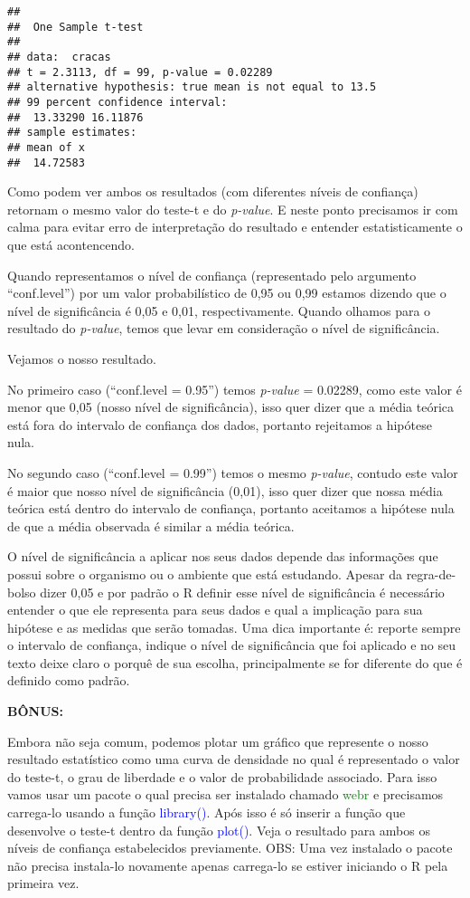 \documentclass[14pt,titlepage, oneside, openany, a4paper]{book}
\begin{document}
\begin{verbatim}
## 
##  One Sample t-test
## 
## data:  cracas
## t = 2.3113, df = 99, p-value = 0.02289
## alternative hypothesis: true mean is not equal to 13.5
## 99 percent confidence interval:
##  13.33290 16.11876
## sample estimates:
## mean of x 
##  14.72583
\end{verbatim}

Como podem ver ambos os resultados (com diferentes níveis de confiança) retornam o mesmo valor do teste-t e do \emph{p-value}. E neste ponto precisamos ir com calma para evitar erro de interpretação do resultado e entender estatisticamente o que está acontencendo.

Quando representamos o nível de confiança (representado pelo argumento ``conf.level'') por um valor probabilístico de 0,95 ou 0,99 estamos dizendo que o nível de significância é 0,05 e 0,01, respectivamente. Quando olhamos para o resultado do \emph{p-value}, temos que levar em consideração o nível de significância.

Vejamos o nosso resultado.

No primeiro caso (``conf.level = 0.95'') temos \emph{p-value} = 0.02289, como este valor é menor que 0,05 (nosso nível de significância), isso quer dizer que a média teórica está fora do intervalo de confiança dos dados, portanto rejeitamos a hipótese nula.

No segundo caso (``conf.level = 0.99'') temos o mesmo \emph{p-value}, contudo este valor é maior que nosso nível de significância (0,01), isso quer dizer que nossa média teórica está dentro do intervalo de confiança, portanto aceitamos a hipótese nula de que a média observada é similar a média teórica.

O nível de significância a aplicar nos seus dados depende das informações que possui sobre o organismo ou o ambiente que está estudando. Apesar da regra-de-bolso dizer 0,05 e por padrão o R definir esse nível de significância é necessário entender o que ele representa para seus dados e qual a implicação para sua hipótese e as medidas que serão tomadas. Uma dica importante é: reporte sempre o intervalo de confiança, indique o nível de significância que foi aplicado e no seu texto deixe claro o porquê de sua escolha, principalmente se for diferente do que é definido como padrão.

\textbf{BÔNUS:}

Embora não seja comum, podemos plotar um gráfico que represente o nosso resultado estatístico como uma curva de densidade no qual é representado o valor do teste-t, o grau de liberdade e o valor de probabilidade associado. Para isso vamos usar um pacote o qual precisa ser instalado chamado \textcolor{green}{webr} e precisamos carrega-lo usando a função \textcolor{blue}{library()}. Após isso é só inserir a função que desenvolve o teste-t dentro da função \textcolor{blue}{plot()}. Veja o resultado para ambos os níveis de confiança estabelecidos previamente. OBS: Uma vez instalado o pacote não precisa instala-lo novamente apenas carrega-lo se estiver iniciando o R pela primeira vez.
\end{document}
